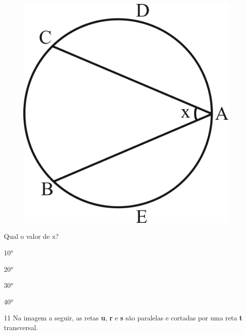 \begin{figure}[htpb!]
\centering
\includegraphics[width=\textwidth]{./ilustras-mat/Simulado_1-atividade_10.png}
\end{figure}

Qual o valor de x?

\begin{escolha}
  
  \item 10°

  \item 20°

  \item 30° 
  
  \item 40° 

\end{escolha}

\num{11} Na imagem a seguir, as retas \textbf{u}, \textbf{r} e \textbf{s} são paralelas
e cortadas por uma reta \textbf{t} transversal.

